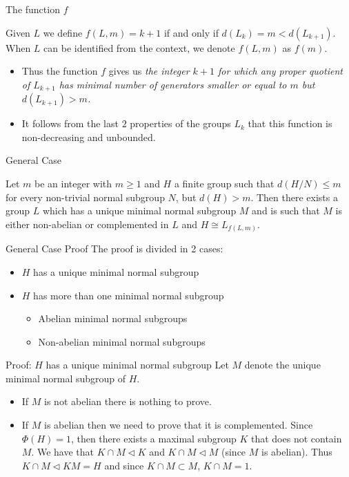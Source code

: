 \documentclass{beamer}
\newcommand{\nsub}{\triangleleft}
\begin{document}
\begin{frame}{The function $f$}
    \begin{definition}
        Given $L$ we define $f(L, m) = k+1$ if and only if $d(L_k) = m < d(L_{k+1})$. When $L$ can be identified from the context, we denote $f(L,m)$ as $f(m)$.
    \end{definition}
    \begin{itemize}
        \item<2-> Thus the function $f$ gives us \textit{the integer $k+1$ for which any proper quotient of $L_{k+1}$ has minimal number of generators smaller or equal to $m$ but $d(L_{k+1}) > m$.}
        \item<3-> It follows from the last $2$ properties of the groups $L_k$ that this function is non-decreasing and unbounded. 
    \end{itemize}
\end{frame}

\begin{frame}{General Case}
    \begin{theorem}
        Let $m$ be an integer with $m \ge 1$ and $H$ a finite group such that $d(H/N) \le m$ for every non-trivial normal subgroup $N$, but $d(H) > m$. Then there exists a group $L$ which has a unique minimal normal subgroup $M$ and is such that $M$ is either non-abelian or complemented in $L$ and $H \cong L_{f(L,m)}$.
    \end{theorem}    

\end{frame}

\begin{frame}{General Case Proof}
    The proof is divided in 2 cases:
    \begin{itemize}
        \item<2-> $H$ has a unique minimal normal subgroup
        \item<3-> $H$ has more than one minimal normal subgroup
        \begin{itemize}
            \item<4-> Abelian minimal normal subgroups
            \item<5-> Non-abelian minimal normal subgroups
        \end{itemize}
    \end{itemize}
\end{frame}

\begin{frame}{Proof: $H$ has a unique minimal normal subgroup}
    Let $M$ denote the unique minimal normal subgroup of $H$. 
    \begin{itemize}
        \item<2-> If $M$ is not abelian there is nothing to prove.
        \item<3-> If $M$ is abelian then we need to prove that it is complemented. 
        Since $\Phi(H) = 1$, then there exists a maximal subgroup $K$ that does not contain $M$. We have that $K \cap M \nsub K$ and $K \cap M \nsub M$ (since $M$ is abelian). Thus $K \cap M \nsub KM = H$ and since $K \cap M \subset M$, $K \cap M = 1$. 
    \end{itemize}
\end{frame}
\end{document}
